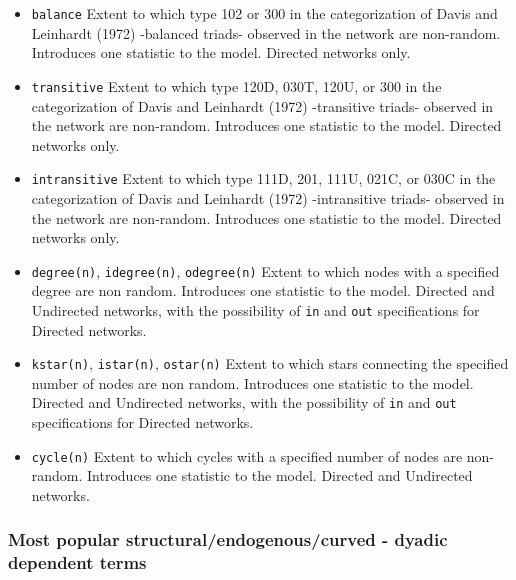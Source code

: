 \documentclass[
]{article}
\begin{document}
\begin{itemize}
\item
  \texttt{balance} Extent to which type 102 or 300 in the categorization
  of Davis and Leinhardt (1972) -balanced triads- observed in the
  network are non-random. Introduces one statistic to the model.
  Directed networks only.
\item
  \texttt{transitive} Extent to which type 120D, 030T, 120U, or 300 in
  the categorization of Davis and Leinhardt (1972) -transitive triads-
  observed in the network are non-random. Introduces one statistic to
  the model. Directed networks only.
\item
  \texttt{intransitive} Extent to which type 111D, 201, 111U, 021C, or
  030C in the categorization of Davis and Leinhardt (1972) -intransitive
  triads- observed in the network are non-random. Introduces one
  statistic to the model. Directed networks only.
\item
  \texttt{degree(n)}, \texttt{idegree(n)}, \texttt{odegree(n)} Extent to
  which nodes with a specified degree are non random. Introduces one
  statistic to the model. Directed and Undirected networks, with the
  possibility of \texttt{in} and \texttt{out} specifications for
  Directed networks.
\item
  \texttt{kstar(n)}, \texttt{istar(n)}, \texttt{ostar(n)} Extent to
  which stars connecting the specified number of nodes are non random.
  Introduces one statistic to the model. Directed and Undirected
  networks, with the possibility of \texttt{in} and \texttt{out}
  specifications for Directed networks.
\item
  \texttt{cycle(n)} Extent to which cycles with a specified number of
  nodes are non-random. Introduces one statistic to the model. Directed
  and Undirected networks.
\end{itemize}

\hypertarget{most-popular-structuralendogenouscurved---dyadic-dependent-terms}{%
\subsubsection{Most popular structural/endogenous/curved - dyadic
dependent
terms}\label{most-popular-structuralendogenouscurved---dyadic-dependent-terms}}
\end{document}
